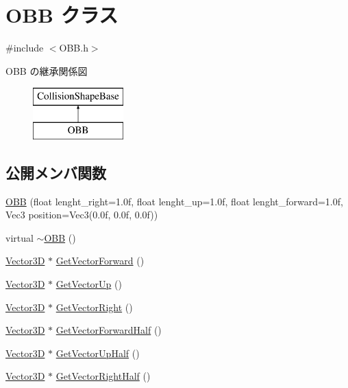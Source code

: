 \hypertarget{class_o_b_b}{}\section{O\+BB クラス}
\label{class_o_b_b}


{\ttfamily \#include $<$O\+B\+B.\+h$>$}

O\+BB の継承関係図\begin{figure}[H]
\begin{center}
\leavevmode
\includegraphics[height=2.000000cm]{class_o_b_b}
\end{center}
\end{figure}
\subsection*{公開メンバ関数}
\begin{DoxyCompactItemize}
\item 
\mbox{\hyperlink{class_o_b_b_a368e87fc4c7cbc04569229010c88f8cc}{O\+BB}} (float lenght\+\_\+right=1.\+0f, float lenght\+\_\+up=1.\+0f, float lenght\+\_\+forward=1.\+0f, Vec3 position=\+Vec3(0.\+0f, 0.\+0f, 0.\+0f))
\item 
virtual \mbox{\hyperlink{class_o_b_b_aa95ab77e0c88faf68db43ed7f6b0ea5a}{$\sim$\+O\+BB}} ()
\item 
\mbox{\hyperlink{class_vector3_d}{Vector3D}} $\ast$ \mbox{\hyperlink{class_o_b_b_a03fdc91609b94007369d3ba168dbb54d}{Get\+Vector\+Forward}} ()
\item 
\mbox{\hyperlink{class_vector3_d}{Vector3D}} $\ast$ \mbox{\hyperlink{class_o_b_b_a0c0fd050224beb2c196e923e177bc0d5}{Get\+Vector\+Up}} ()
\item 
\mbox{\hyperlink{class_vector3_d}{Vector3D}} $\ast$ \mbox{\hyperlink{class_o_b_b_ace28639ea3a6c38d994d82d0dd40496e}{Get\+Vector\+Right}} ()
\item 
\mbox{\hyperlink{class_vector3_d}{Vector3D}} $\ast$ \mbox{\hyperlink{class_o_b_b_a03218b64dad1985876e7bad09f4a61ce}{Get\+Vector\+Forward\+Half}} ()
\item 
\mbox{\hyperlink{class_vector3_d}{Vector3D}} $\ast$ \mbox{\hyperlink{class_o_b_b_a48255d7b9af2d2ea109de41787c30a3a}{Get\+Vector\+Up\+Half}} ()
\item 
\mbox{\hyperlink{class_vector3_d}{Vector3D}} $\ast$ \mbox{\hyperlink{class_o_b_b_a1c3a21fd4ff8dcc55d4f5d20c563ebd6}{Get\+Vector\+Right\+Half}} ()
\end{DoxyCompactItemize}
